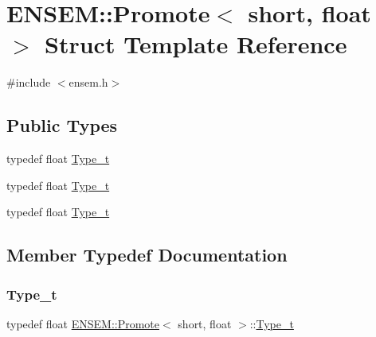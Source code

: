\hypertarget{structENSEM_1_1Promote_3_01short_00_01float_01_4}{}\section{E\+N\+S\+EM\+:\+:Promote$<$ short, float $>$ Struct Template Reference}
\label{structENSEM_1_1Promote_3_01short_00_01float_01_4}


{\ttfamily \#include $<$ensem.\+h$>$}

\subsection*{Public Types}
\begin{DoxyCompactItemize}
\item 
typedef float \mbox{\hyperlink{structENSEM_1_1Promote_3_01short_00_01float_01_4_a1d4ac20ed44f25a8d1863eda583b89da}{Type\+\_\+t}}
\item 
typedef float \mbox{\hyperlink{structENSEM_1_1Promote_3_01short_00_01float_01_4_a1d4ac20ed44f25a8d1863eda583b89da}{Type\+\_\+t}}
\item 
typedef float \mbox{\hyperlink{structENSEM_1_1Promote_3_01short_00_01float_01_4_a1d4ac20ed44f25a8d1863eda583b89da}{Type\+\_\+t}}
\end{DoxyCompactItemize}


\subsection{Member Typedef Documentation}
\mbox{\label{structENSEM_1_1Promote_3_01short_00_01float_01_4_a1d4ac20ed44f25a8d1863eda583b89da}} 
\subsubsection{\texorpdfstring{Type\_t}{Type\_t}\hspace{0.1cm}{\footnotesize\ttfamily [1/3]}}
{\footnotesize\ttfamily typedef float \mbox{\hyperlink{structENSEM_1_1Promote}{E\+N\+S\+E\+M\+::\+Promote}}$<$ short, float $>$\+::\mbox{\hyperlink{structENSEM_1_1Promote_3_01short_00_01float_01_4_a1d4ac20ed44f25a8d1863eda583b89da}{Type\+\_\+t}}}

